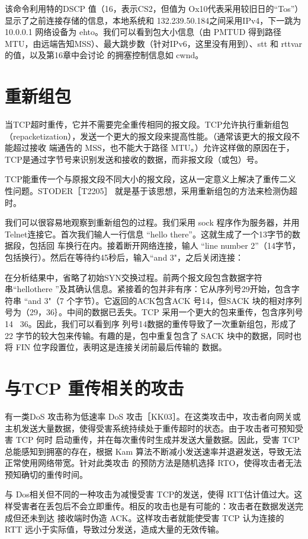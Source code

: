 该命令利用特的DSCP 值（16，表示CS2，但值为 Ox10代表采用较旧日的“Tos”）显示了之前连接存储的信息，本地系统和
132.239.50.184之间采用IPv4，下一跳为10.0.0.1
网络设备为 ehto。我们可以看到包大小信息（由 PMTUD
得到路径MTU，由远端告知MSS）、最大跳步数（针对IPv6，这里没有用到）、stt 和 rttvar 的值，以及第16章中会讨论
的拥塞控制信息如 cwnd。

\section{重新组包}

当TCP超时重传，它并不需要完全重传相同的报文段。TCP允许执行重新组包（repacketization），发送一个更大的报文段来提高性能。（通常该更大的报文段不能超过接收
端通告的 MSS，也不能大于路径 MTU。）允许这样做的原因在于，TCP是通过字节号来识别发送和接收的数据，而非报文段（或包）号。

TCP能重传一个与原报文段不同大小的报文段，这从一定意义上解决了重传二义性问题。STODER［T2205］ 就是基于该思想，采用重新组包的方法来检测伪超时。

我们可以很容易地观察到重新组包的过程。我们采用 sock 程序作为服务器，并用 Telnet连接它。首次我们输人一行信息 “hello
there”。这就生成了一个13字节的数据段，包括回
车换行在内。接着断开网络连接，输人 “line number 2”（14字节，包括换行）。然后在等待约45秒后，输入“and 3"，之后关闭连接：

在分析结果中，省略了初始SYN交换过程。前两个报文段包含数据字符串“hellothere
”及其确认信息。紧接着的包并非有序：它从序列号29开始，包含字符串 “and 3"（7
个字节）。它返回的ACK包含ACK 号14，但SACK 块的相对序列号为（29，36｝。中间的数据已丢失。TCP
采用一个更大的包来重传，包含序列号14 ~36。因此，我们可以看到序
列号14数据的重传导致了一次重新组包，形成了 22 字节的较大包来传输。有趣的是，包中重复包含了 SACK 块中的数据，同时也将 FIN
位字段置位，表明这是连接关闭前最后传输的
数据。

\section{与TCP 重传相关的攻击}
有一类DoS 攻击称为低速率 DoS
攻击［KK03］。在这类攻击中，攻击者向网关或主机发送大量数据，使得受害系统持续处于重传超时的状态。由于攻击者可预知受害 TCP 何时
启动重传，并在每次重传时生成并发送大量数据。因此，受害 TCP 总能感知到拥塞的存在，根据 Kam
算法不断减小发送速率并退避发送，导致无法正常使用网络带宽。针对此类攻击
的预防方法是随机选择 RTO，使得攻击者无法预知确切的重传时间。

与 Dos相关但不同的一种攻击为减慢受害 TCP的发送，使得
RTT估计值过大。这样受害者在丢包后不会立即重传。相反的攻击也是有可能的：攻击者在数据发送完成但还未到达
接收端时伪造 ACK。这样攻击者就能使受害 TCP 认为连接的 RTT 远小于实际值，导致过分发送，造成大量的无效传输。

